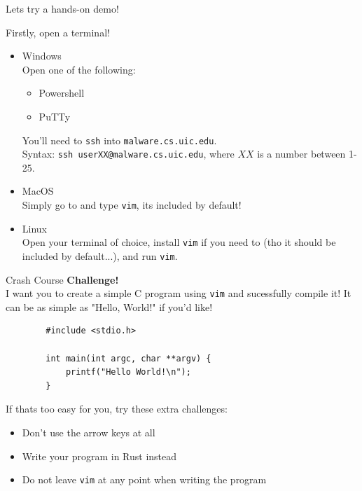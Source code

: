 \documentclass{beamer}
\begin{document}
\begin{frame}
	Lets try a hands-on demo!
	\pause

	Firstly, open a terminal!
	\begin{itemize}
		\item Windows\\
			Open one of the following:
			\begin{itemize}
				\item Powershell
				\item PuTTy
			\end{itemize}
			You'll need to \texttt{ssh} into
			\texttt{malware.cs.uic.edu}.\\
			Syntax: \texttt{ssh userXX@malware.cs.uic.edu}, where
			$XX$ is a number between 1-25.
		\item MacOS\\
			Simply go to  and
			type \texttt{vim}, its included by default!
		\item Linux\\
			Open your terminal of choice, install \texttt{vim} if
			you need to (tho it should be included by default...),
			and run \texttt{vim}.
	\end{itemize}
\end{frame}

\begin{frame}[fragile]{Crash Course}
	\textbf{Challenge!}\\
	I want you to create a simple C program using \texttt{vim} and
	sucessfully compile it! It can be as simple as "Hello, World!" if you'd
	like!

	\begin{verbatim}
		#include <stdio.h>

		int main(int argc, char **argv) {
			printf("Hello World!\n");
		}
	\end{verbatim}

	If thats too easy for you, try these extra challenges:
	\begin{itemize}
		\item Don't use the arrow keys at all
		\item Write your program in Rust instead
		\item Do not leave \texttt{vim} at any point when writing the
			program
	\end{itemize}
\end{frame}
\end{document}
